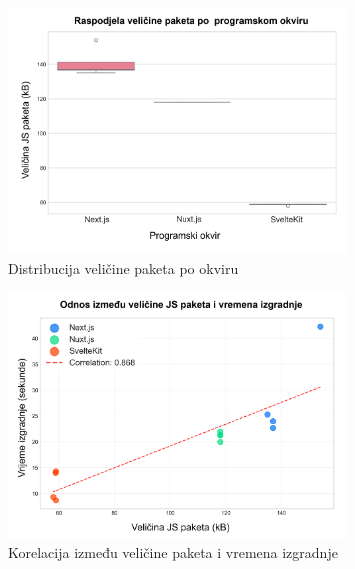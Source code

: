 \begin{figure}[H]
    \centering
    \includegraphics[width=0.8\textwidth]{slike/rezultati/dodatne-metrike/bundle_size_distribution_by_framework.png}
    \caption{Distribucija veličine paketa po okviru}
    \label{fig:bundle_size_distribution_by_framework}
\end{figure}

\begin{figure}[H]
    \centering
    \includegraphics[width=0.8\textwidth]{slike/rezultati/dodatne-metrike/bundle_size_vs_build_time_correlation.png}
    \caption{Korelacija između veličine paketa i vremena izgradnje}
    \label{fig:bundle_size_vs_build_time_correlation}
\end{figure}

